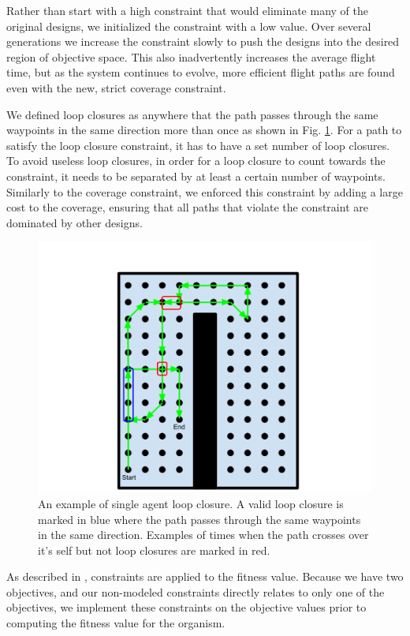 \documentclass[letterpaper, 10 pt, conference]{ieeeconf}  %
\begin{document}
Rather than start with a high constraint that would eliminate many of the original designs, we initialized the constraint with a low value. Over several generations we increase the constraint slowly to push the designs into the desired region of objective space. This also inadvertently increases the average flight time, but as the system continues to evolve, more efficient flight paths are found even with the new, strict coverage constraint.

We defined loop closures as anywhere that the path passes through the same waypoints in the same direction more than once as shown in Fig. \ref{fig:loop_closure}. For a path to satisfy the loop closure constraint, it has to have a set number of loop closures. To avoid useless loop closures, in order for a loop closure to count towards the constraint, it needs to be separated by at least a certain number of waypoints. Similarly to the coverage constraint, we enforced this constraint by adding a large cost to the coverage, ensuring that all paths that violate the constraint are dominated by other designs.

\begin{figure}
\centering
\includegraphics[width=0.8\linewidth]{figures/loop_closure.png}
\caption{An example of single agent loop closure. A valid loop closure is marked in blue where the path passes through the same waypoints in the same direction. Examples of times when the path crosses over it's self but not loop closures are marked in red.}
\label{fig:loop_closure}
\end{figure}

As described in \cite{Parkinson2019}, constraints are applied to the fitness value. Because we have two objectives, and our non-modeled constraints directly relates to only one of the objectives, we implement these constraints on the objective values prior to computing the fitness value for the organism.
\end{document}
